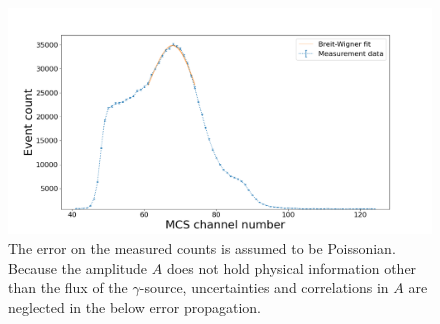 \begin{figure}
	\centering
	\includegraphics[width=1.0\textwidth]{./fig/calibration.png}
	\caption{The error on the measured counts is assumed to be Poissonian.
	Because the amplitude $A$ does not hold physical information other than the 
	flux of the $\gamma$-source, uncertainties and correlations in $A$ are
	neglected in the below error propagation.}
	\label{fig:ecal}
\end{figure}

